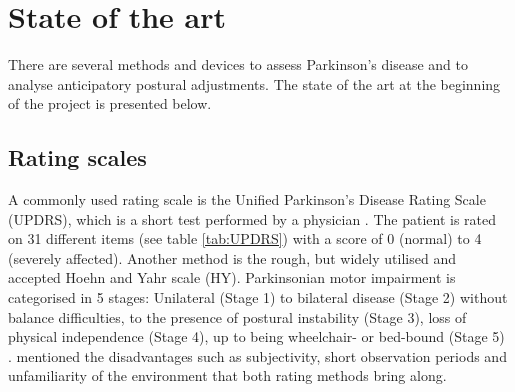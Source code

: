 \section{State of the art}

There are several methods and devices to assess Parkinson's disease and to analyse anticipatory postural adjustments. The state of the art at the beginning of the project is presented below.

\subsection{Rating scales}

A commonly used rating scale is the Unified Parkinson’s Disease Rating Scale (UPDRS), which is a short test performed by a physician \cite{klerk_long-term_2009}. The patient is rated on 31 different items (see table \ref{tab:UPDRS}) with a score of 0 (normal) to 4 (severely affected). Another method is the rough, but widely utilised and accepted Hoehn and Yahr scale (HY). Parkinsonian motor impairment is categorised in 5 stages: Unilateral (Stage 1) to bilateral disease (Stage 2) without balance difficulties, to the presence of postural instability (Stage 3), loss of physical independence (Stage 4), up to being wheelchair- or bed-bound (Stage 5) \cite{goetz_movement_2004}. \citeauthor{klerk_long-term_2009} \cite{klerk_long-term_2009} mentioned the disadvantages such as subjectivity, short observation periods and unfamiliarity of the environment that both rating methods bring along.

